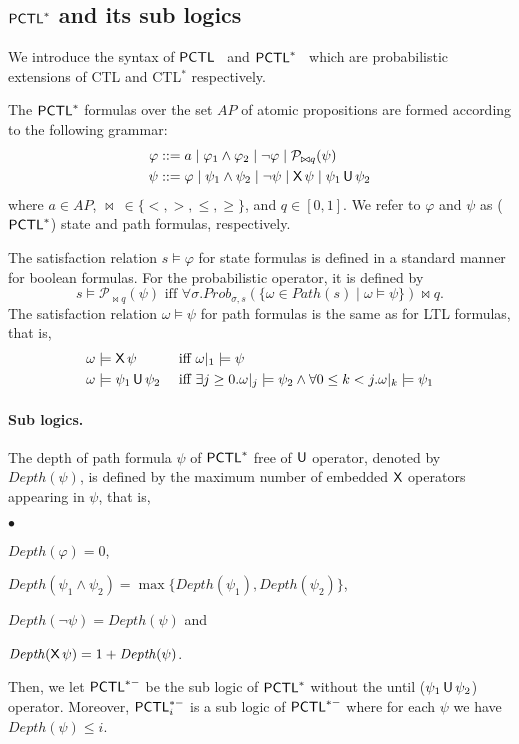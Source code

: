 \documentclass{LMCS}
\def\phi{\varphi}
\DeclareMathOperator{\U}{\text{\sf U}}
\DeclareMathOperator{\X}{\text{\sf X}}
\newcommand{\AP}{\mathit{AP}}
\newcommand{\PCTL}{{\sf PCTL}}
\newcommand{\MC}[1]{\mathcal{#1}}
\newcommand{\DEPTH}{\mathit{Depth}}
\newcommand{\MEASURE}{\mathit{Prob}}
\begin{document}
\subsection{\texorpdfstring{$\PCTL^{*}$}{PCTL*} and its sub logics}
We introduce the syntax of $\PCTL$~\cite{hansson1994logic} and $\PCTL^{*}$~\cite{Aziz1995UWT} which are probabilistic extensions of {\sf CTL} and {\sf CTL}$^{*}$ respectively.

The $\PCTL^{*}$  formulas over the set $\AP$ of atomic propositions are
formed according to the following grammar:
\begin{align*}
\phi &::= a \mid \phi_1\wedge\phi_2\mid\neg \phi\mid\MC{P}_{\bowtie q}(\psi)\\
\psi &::=\phi\mid\psi_1\land\psi_2\mid\neg\psi\mid\X\psi\mid\psi_1\U\psi_2
\end{align*}
where $a\in\AP$, $\bowtie\ \in\{<,>,\leq,\geq\}$, and $q\in[0,1]$. We refer to $\phi$ and $\psi$ as ($\PCTL^{*}$) state and
path formulas, respectively.

The satisfaction relation $s\models \phi$ for state formulas is
 defined in a standard manner for boolean formulas. For the probabilistic operator, it is defined by
$$s\models\MC{P}_{\bowtie q}(\psi)\text{ iff }\forall
\sigma.\MEASURE_{\sigma,s}(\{\omega\in\mathit{Path}(s)\mid\omega\models\psi\})\bowtie q.$$
The satisfaction relation $\omega\models\psi$ for path
formulas is the same as for LTL formulas, that is,
\begin{align*}
&\omega\models\X\psi &&\text{ iff }  \omega|_1\models\psi\\
&\omega\models\psi_1\U\psi_2 && \text{ iff }   \exists j\geq
0.\omega|_j\models\psi_2\land\forall 0\leq k<j.\omega|_k\models\psi_1
\end{align*}




\paragraph{Sub logics.}
The depth of path formula $\psi$ of $\PCTL^{*}$ free of $\U$ operator, denoted by $\DEPTH(\psi)$, is defined by the maximum number of embedded $\X$ operators appearing in $\psi$, that is,
\begin{iteMize}{$\bullet$}
\item $\DEPTH(\phi)=0$,
\item $\DEPTH(\psi_1\land\psi_2)=\max\{\DEPTH(\psi_1),\DEPTH(\psi_2)\}$,
\item $\DEPTH(\neg\psi)=\DEPTH(\psi)$ and
\item $\DEPTH(\X\psi)=1+\DEPTH(\psi)$.
\end{iteMize}
Then, we let
$\PCTL^{*-}$ be the sub logic of $\PCTL^{*}$ without the until ($\psi_1\U\psi_2$) operator. Moreover, $\PCTL^{*-}_i$ is a sub logic of $\PCTL^{*-}$ where
 for each $\psi$ we have $\DEPTH(\psi)\leq i$.
\end{document}
